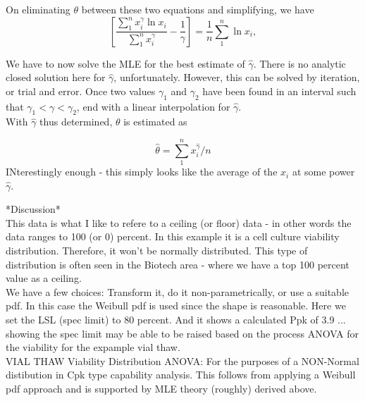 \documentclass[11pt, oneside]{article}	%
\begin{document}
On eliminating $\theta$ between these two equations and simplifying, we have
$$
\left[\frac{\sum_{1}^{n} x_{i}^{\gamma} \ln x_{i}}{\sum_{1}^{n} x_{i}^{\gamma}}-\frac{1}{\gamma}\right]=\frac{1}{n} \sum_{1}^{n} \ln x_{i},
$$


\noindent
We have to now solve the MLE for the best estimate of $\hat{\gamma}$. There is no analytic closed solution here for $\hat{\gamma}$, unfortunately. However, this can be solved by iteration, or trial and error. Once two values $\gamma_{1}$ and $\gamma_{2}$ have been found in an interval such that $\gamma_{1}<\gamma<\gamma_{2}$, end with a linear interpolation for $\hat{\gamma}$.\\




With $\hat{\gamma}$ thus determined, $\theta$ is estimated as

$$
\hat{\theta}=\sum_{1}^{n} x_{i}^{\hat{\gamma}} / n
$$
\noindent
INterestingly enough - this simply looks like the average of the $x_{i}$ at some power $\hat{\gamma}$.





\newpage
*Discussion*\\ 

This data is what I like to refere to a ceiling (or floor) data - in other words the data ranges to 100 (or 0) percent. In this example it is a cell culture viability distribution. Therefore, it won't be normally distributed. This type of distribution is often seen in the Biotech area - where we have a top 100 percent value as a ceiling.\\

We have a few choices: Transform it, do it non-parametrically, or use a suitable pdf. In this case the Weibull pdf is used since the shape is reasonable. Here we set the LSL (spec limit) to 80 percent. And it shows a calculated Ppk of 3.9 ... showing the spec limit may be able to be raised based on the process ANOVA for the viability for the expample vial thaw.\\ 

VIAL THAW Viability Distribution ANOVA: For the purposes of a NON-Normal distibution in Cpk type capability analysis. This follows from applying a Weibull pdf approach and is supported by MLE theory (roughly) derived above. 
\end{document}
